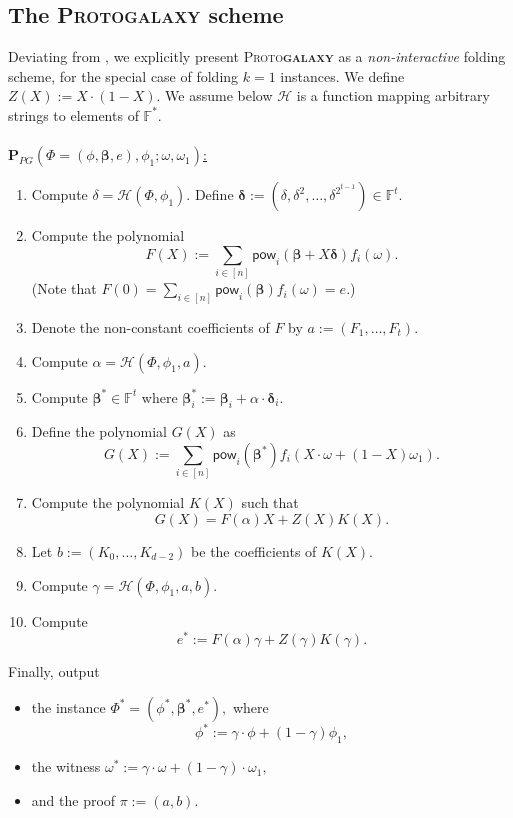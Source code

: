 \documentclass[11pt]{article} %
\newcommand{\protogal}{{\scshape Proto\bfseries{galaxy}}\xspace}
\newcommand{\F}{\ensuremath{\mathbb F}\xspace}
\newcommand{\Fstar}{\ensuremath{\mathbb F^*}\xspace}
\newcommand{\rej}{\ensuremath{\mathsf{reject}}\xspace}
\newcommand{\defeq}{:=}
\newcommand{\hash}{\ensuremath{\mathcal{H}}\xspace}
\newcommand{\prv}{\ensuremath{\mathsf{\mathbf{P}}}\xspace}
\newcommand{\prf}{\ensuremath{\mathsf{\pi}}\xspace}
\newcommand{\inst}{\ensuremath{\phi}\xspace}
\newcommand{\wit}{\ensuremath{\mathsf{\omega}}\xspace}
\newcommand{\ver}{\ensuremath{\mathsf{\mathbf{V}}}\xspace}
\newcommand{\sumi}[1]{\sum_{i\in[#1]}}
\newcommand{\betaa}{\ensuremath{\mathbf{\boldsymbol{\beta}}}\xspace}
\newcommand{\deltaa}{\ensuremath{\mathbf{\boldsymbol{\delta}}}\xspace}
\newcommand{\instt}{\ensuremath{\Phi^*}\xspace}
\newcommand{\insttbase}{\ensuremath{\Phi}\xspace}
\newcommand{\pow}{\ensuremath{\mathsf{pow}}\xspace}
\newcommand{\inststar}{\ensuremath{\inst^*}\xspace}
\newcommand{\witstar}{\ensuremath{\wit^*}\xspace}
\begin{document}
\subsection{The \protogal scheme}
Deviating from \cite{protogal}, we explicitly present \protogal as a \emph{non-interactive} folding scheme, for the special case of folding $k=1$ instances.
We define $Z(X)\defeq X\cdot(1-X)$. We assume below \hash is a function mapping arbitrary strings to elements of \Fstar. \\ \\ \noindent
\underline{$\prv_{PG}(\insttbase=(\inst,\betaa,e),\inst_1;\wit,\wit_1)$:}
\begin{enumerate}
 \item Compute $\delta=\hash(\insttbase,\inst_1)$. Define $\deltaa\defeq (\delta,\delta^2,\ldots,\delta^{2^{t-1}})\in \F^t$.
 \item\label{step:computeF} Compute the polynomial 
 \[F(X)\defeq \sumi{n}\pow_i(\betaa+X\deltaa) f_i(\wit).\]
 (Note that $F(0)=\sumi{n} \pow_i(\betaa) f_i(\wit) = e$.)
\item\label{step:sendFcoeffs} Denote the non-constant coefficients of $F$ by $a\defeq (F_1,\ldots,F_{t})$.
\item Compute $\alpha = \hash(\insttbase,\inst_1,a)$.
\item\label{step:computeBetastar} Compute $\betaa^*\in \F^{t}$ where $\betaa^*_i\defeq \betaa_i+\alpha\cdot \deltaa_i$.
\item\label{step:computeG} Define the polynomial $G(X)$ as 
\[G(X)\defeq \sumi{n}\pow_i(\betaa^*) f_i(X\cdot \wit + (1-X)\wit_1).\]
\item Compute the polynomial $K(X)$ such that 
\[G(X)= F(\alpha) X + Z(X) K(X).\]
\item\label{step:sendK} Let $b\defeq (K_0,\ldots,K_{d-2})$ be the coefficients of $K(X)$.
\item Compute $\gamma=\hash(\insttbase,\inst_1,a,b)$.
\item\label{step:compute-estar} Compute 
\[e^* \defeq F(\alpha)\gamma + Z(\gamma)K(\gamma).\]
\end{enumerate}
Finally, output
\begin{itemize}
\item the instance
$\instt=(\inststar,\betaa^*,e^*),$
where \[\inst^*\defeq \gamma\cdot \inst + (1-\gamma) \inst_1,\]


\item the witness 
$\witstar\defeq \gamma\cdot \wit + (1-\gamma)\cdot \wit_1,$
\item and the proof $\prf\defeq (a,b)$.\\
\end{itemize}
\end{document}
